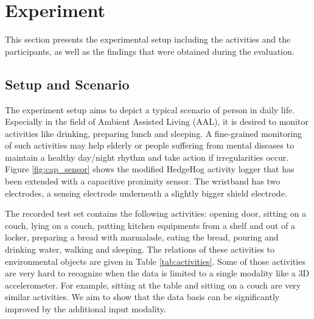 \documentclass[runningheads,a4paper]{llncs}
\begin{document}
\section{Experiment}
\label{sect:experiment}

This section presents the experimental setup including the activities and the participants, as well as the findings that were obtained during the evaluation.

\subsection{Setup and Scenario}

The experiment setup aims to depict a typical scenario of person in daily life. Especially in the field of Ambient Assisted Living (AAL), it is desired to monitor activities like drinking, preparing lunch and sleeping. A fine-grained monitoring of such activities may help elderly or people suffering from mental diseases to maintain a healthy day/night rhythm and take action if irregularities occur. Figure \ref{fig:cap_sensor} shows the modified HedgeHog activity logger that has been extended with a capacitive proximity sensor. The wristband has two electrodes, a sensing electrode underneath a slightly bigger shield electrode. 

The recorded test set contains the following activities: opening door, sitting on a couch, lying on a couch, putting kitchen equipments from a shelf and out of a locker, preparing a bread with marmalade, eating the bread, pouring and drinking water, walking and sleeping. The relations of these activities to environmental objects are given in Table \ref{tab:activities}. Some of those activities are very hard to recognize when the data is limited to a single modality like a 3D accelerometer. For example, sitting at the table and sitting on a couch are very similar activities. We aim to show that the data basis can be significantly improved by the additional input modality. 
\end{document}
